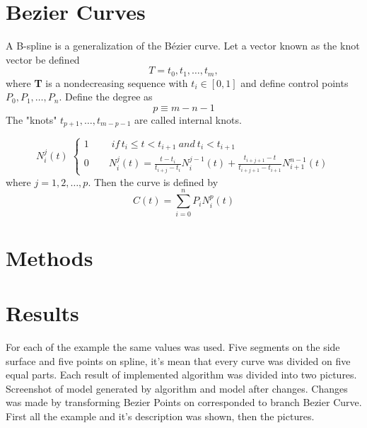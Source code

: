 \documentclass[b5paper,twoside,11pt]{article}
\begin{document}
\section{Bezier Curves}
A B-spline is a generalization of the Bézier curve.  Let a vector known as the knot vector be defined 
\begin{equation*}
T={t_0,t_1,\ldots,t_m},
\end{equation*}
where \textbf{T} is a nondecreasing sequence with $t_i\in[0,1]$ and define control points \textbf{$P_0,P_1,\ldots,P_n$}. Define the degree as
\begin{equation*}
p\equiv m-n-1
\end{equation*}
The "knots" $t_{p+1},\ldots,t_{m-p-1}$ are called internal knots.


\begin{equation*} N_{i}^{j}(t)\;
\begin{cases} 1\qquad \;if \, t_i\leq t< t_{i+1}\:and\: t_i<t_{i+1} \\ 
0 \qquad   N_{i}^{j}(t)=\frac{t-t_i}{t_{i+j}-t_i} N_{i}^{j-1}(t) + \frac{t_{i+j+1} - t}{t_{i+j+1} - t_{i+1}} N_{i+1}^{n-1}(t)
 \end{cases}
  \end{equation*}
  where $j=1,2,\ldots,p$. Then the curve is defined by
  \begin{equation*}
  C(t)=\sum\limits_{i=0}^n P_i N_{i}^{p}(t)
  \end{equation*}

\section{Methods}

\section{Results}
For each of the example the same values was used. Five segments on the side surface and five points on spline, it's mean that every curve was divided on five equal parts. Each result of implemented algorithm was divided into two pictures. Screenshot of model generated by algorithm and model after changes. Changes was made by transforming Bezier Points on corresponded to branch Bezier Curve. First all the example and it's description was shown, then the pictures.
\end{document}
